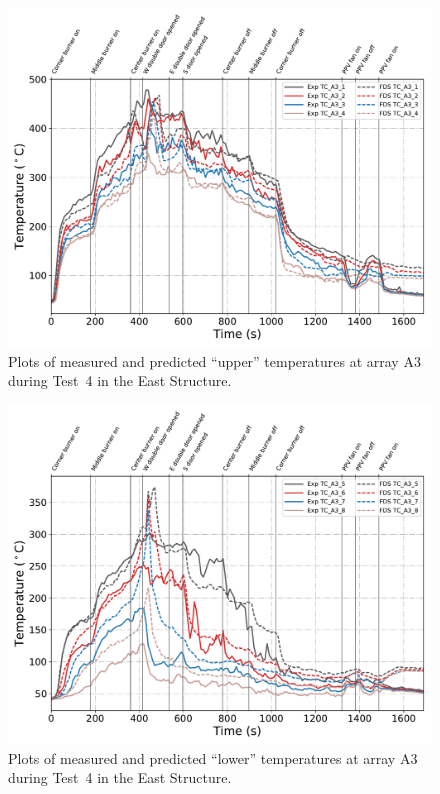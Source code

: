 \clearpage
\begin{figure}[p]
	\centering
	\includegraphics[width=\columnwidth]{Figures/Plots/Validation/Temperature/Test_4_TC_A3_upper}
	\caption{Plots of measured and predicted ``upper'' temperatures at array A3 during Test~4 in the East Structure.}
	\label{fig:TCA3_upper_data_Test4}
\end{figure}
\begin{figure}[p]
	\centering
	\includegraphics[width=\columnwidth]{Figures/Plots/Validation/Temperature/Test_4_TC_A3_lower}
	\caption{Plots of measured and predicted ``lower'' temperatures at array A3 during Test~4 in the East Structure.}
	\label{fig:TCA3_lower_data_Test4}
\end{figure}

